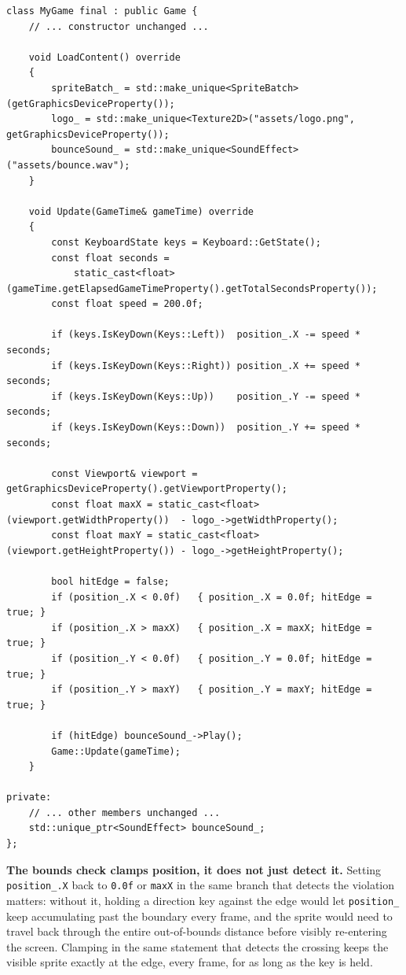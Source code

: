 \begin{lstlisting}
class MyGame final : public Game {
    // ... constructor unchanged ...

    void LoadContent() override
    {
        spriteBatch_ = std::make_unique<SpriteBatch>(getGraphicsDeviceProperty());
        logo_ = std::make_unique<Texture2D>("assets/logo.png", getGraphicsDeviceProperty());
        bounceSound_ = std::make_unique<SoundEffect>("assets/bounce.wav");
    }

    void Update(GameTime& gameTime) override
    {
        const KeyboardState keys = Keyboard::GetState();
        const float seconds =
            static_cast<float>(gameTime.getElapsedGameTimeProperty().getTotalSecondsProperty());
        const float speed = 200.0f;

        if (keys.IsKeyDown(Keys::Left))  position_.X -= speed * seconds;
        if (keys.IsKeyDown(Keys::Right)) position_.X += speed * seconds;
        if (keys.IsKeyDown(Keys::Up))    position_.Y -= speed * seconds;
        if (keys.IsKeyDown(Keys::Down))  position_.Y += speed * seconds;

        const Viewport& viewport = getGraphicsDeviceProperty().getViewportProperty();
        const float maxX = static_cast<float>(viewport.getWidthProperty())  - logo_->getWidthProperty();
        const float maxY = static_cast<float>(viewport.getHeightProperty()) - logo_->getHeightProperty();

        bool hitEdge = false;
        if (position_.X < 0.0f)   { position_.X = 0.0f; hitEdge = true; }
        if (position_.X > maxX)   { position_.X = maxX; hitEdge = true; }
        if (position_.Y < 0.0f)   { position_.Y = 0.0f; hitEdge = true; }
        if (position_.Y > maxY)   { position_.Y = maxY; hitEdge = true; }

        if (hitEdge) bounceSound_->Play();
        Game::Update(gameTime);
    }

private:
    // ... other members unchanged ...
    std::unique_ptr<SoundEffect> bounceSound_;
};
\end{lstlisting}

\textbf{The bounds check clamps position, it does not just detect it.} Setting
\texttt{position\_.X} back to \texttt{0.0f} or \texttt{maxX} in the same branch that detects
the violation matters: without it, holding a direction key against the edge would let
\texttt{position\_} keep accumulating past the boundary every frame, and the sprite would need
to travel back through the entire out-of-bounds distance before visibly re-entering the
screen. Clamping in the same statement that detects the crossing keeps the visible sprite
exactly at the edge, every frame, for as long as the key is held.

